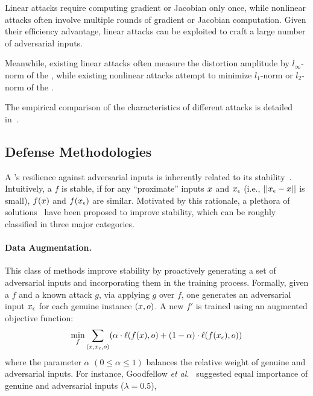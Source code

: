 Linear attacks require computing gradient or Jacobian only once, while nonlinear attacks often involve multiple rounds of gradient or Jacobian computation. Given their efficiency advantage, linear attacks can be exploited to craft a large number of adversarial inputs.


Meanwhile, existing linear attacks often measure the distortion amplitude by $l_\infty$-norm of the \pv, while existing nonlinear attacks attempt to minimize $l_1$-norm or $l_2$-norm of the \pv.

The empirical comparison of the characteristics of different attacks is detailed in~.


\subsection{Defense Methodologies}
\label{sec:defense}

A \dnn's resilience against adversarial inputs is inherently related to its stability~\cite{Bastani:2016:arXiv}. Intuitively, a \dnn $f$ is stable, if for any ``proximate'' inputs $x$ and $x_{\epsilon}$ (i.e., $||x_{\epsilon} - x||$ is small), $f(x)$ and $f(x_{\epsilon})$ are similar. Motivated by this rationale, a plethora of solutions~\cite{Gu:2014:arxiv,Goodfellow:2014:arxiv,Huang:2015:arxiv,Shaham:2015:arxiv,Papernot:2016:sp} have been proposed to improve \dnn stability, which can be roughly classified in three major categories.

\paragraph*{Data Augmentation.\;}
This class of methods improve \dnn stability by proactively generating a set of adversarial inputs and incorporating them in the training process. Formally, given a \dnn $f$ and a known attack $g$, via applying $g$ over $f$, one generates an adversarial input $x_{\epsilon}$ for each genuine instance $(x, o)$. A new \dnn $f'$ is trained using an augmented objective function:
\begin{equation*}
\min_f \sum_{(x, x_{\epsilon}, o)}  (\alpha \cdot \ell(f(x), o) + (1-\alpha) \cdot \ell(f(x_{\epsilon}), o))
\end{equation*}
where the parameter $\alpha$ $(0 \leq \alpha \leq 1)$ balances the relative weight of genuine and adversarial inputs.
For instance, Goodfellow {\em et al.}~\cite{Goodfellow:2014:arxiv} suggested equal importance of genuine and adversarial inputs ($\lambda = 0.5$),


